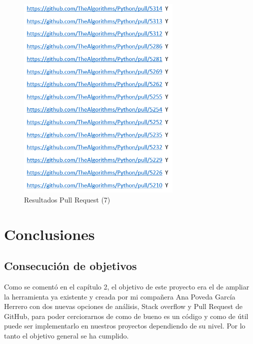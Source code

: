 \documentclass[a4paper, 12pt]{book}
\begin{document}
\begin{figure}
	\centering
    \includegraphics[width=0.7\textwidth]{img/git11}
    \caption{Resultados Pull Request (7)}
 \end{figure}
 


\cleardoublepage
\chapter{Conclusiones}
\label{chap:conclusiones}


\section{Consecución de objetivos}
\label{sec:consecucion-objetivos}

Como se comentó en el capítulo 2, el objetivo de este proyecto era el de ampliar la herramienta ya existente y creada por mi compañera Ana Poveda García Herrero con dos nuevas opciones de análisis, Stack overflow y Pull Request de GitHub, para poder cerciorarnos de como de bueno es un código y como de útil puede ser implementarlo en nuestros proyectos dependiendo de su nivel. Por lo tanto el objetivo general se ha cumplido.
\end{document}
